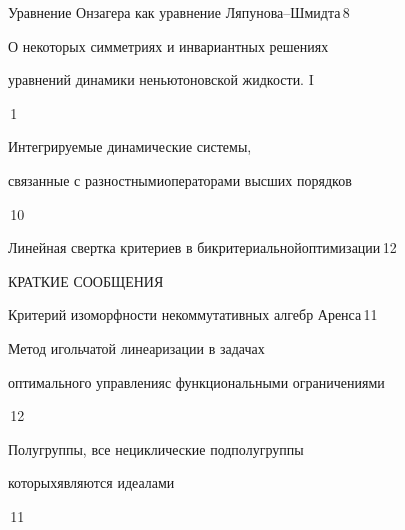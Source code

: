 

{Уравнение Онзагера как уравнение Ляпунова--Шмидта}{\No\,8}




{О некоторых симметриях и инвариантных решениях\newline


уравнений динамики неньютоновской жидкости. I}{\No\,1}






{Интегрируемые динамические системы, 


связанные с разностными\newline операторами высших порядков}{\No\,10}




{Линейная свертка критериев в бикритериальной\newline оптимизации}{\No\,12}







\bigskip


{\centerline {КРАТКИЕ СООБЩЕНИЯ}}


\bigskip







{Критерий изоморфности  некоммутативных алгебр Аренса}{\No\,11}






{Метод игольчатой линеаризации в задачах


оптимального управления\newline с функциональными ограничениями}{\No\,12}




{Полугруппы, все нециклические подполугруппы 


которых\newline являются идеалами}{\No\,11}



